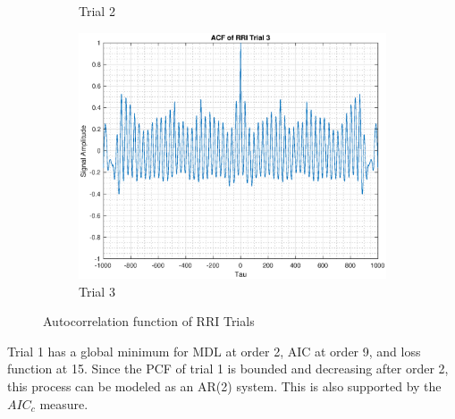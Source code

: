 \begin{figure}[h!]
\begin{subfigure}{0.32\textwidth}
\caption{Trial 2}
\label{fig:heart_acf_t2}
\end{subfigure}
\begin{subfigure}{0.32\textwidth}
\centering
\includegraphics[width = \textwidth]{heart_acf_t3}
\caption{Trial 3}
\label{fig:heart_acf_t3}
\end{subfigure}
\caption{Autocorrelation function of RRI Trials}
\label{fig:ar_heart}
\end{figure}

Trial 1 has a global minimum for MDL at order 2, AIC at order 9, and loss function at 15. Since the PCF of trial 1 is bounded and decreasing after order 2, this process can be modeled as an AR(2) system. This is also supported by the $AIC_c$ measure.\\

